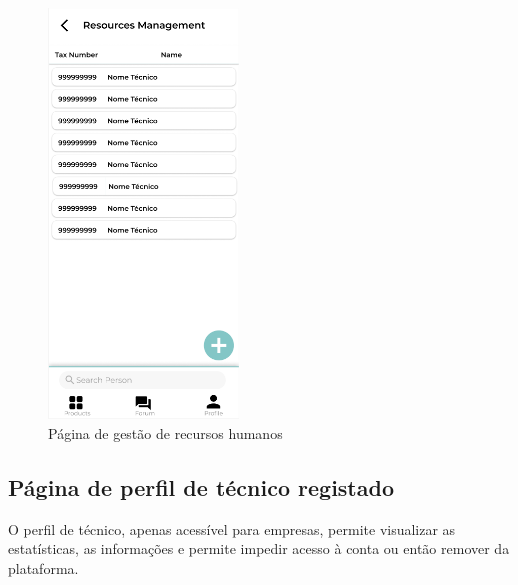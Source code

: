 \begin{figure}[htb]
  \centering
  \includegraphics[width=0.45\textwidth]{images/mockups/human_resources.png}
  \caption{Página de gestão de recursos humanos}
  \label{fig:31}
\end{figure}

\newpage

\subsection{Página de perfil de técnico registado}

O perfil de técnico, apenas acessível para empresas, permite visualizar as estatísticas, as informações e permite impedir acesso à conta ou então remover da plataforma.

